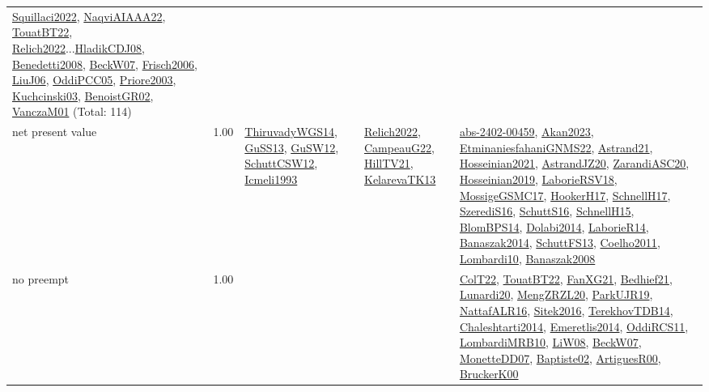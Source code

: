 {\begin{longtable}{p{3cm}r>{\raggedright\arraybackslash}p{6cm}>{\raggedright\arraybackslash}p{6cm}>{\raggedright\arraybackslash}p{8cm}}
\hyperref[detail:Squillaci2022]{Squillaci2022}, \hyperref[detail:NaqviAIAAA22]{NaqviAIAAA22}, \hyperref[detail:TouatBT22]{TouatBT22}, \hyperref[detail:Relich2022]{Relich2022}...\hyperref[detail:HladikCDJ08]{HladikCDJ08}, \hyperref[detail:Benedetti2008]{Benedetti2008}, \hyperref[detail:BeckW07]{BeckW07}, \hyperref[detail:Frisch2006]{Frisch2006}, \hyperref[detail:LiuJ06]{LiuJ06}, \hyperref[detail:OddiPCC05]{OddiPCC05}, \hyperref[detail:Priore2003]{Priore2003}, \hyperref[detail:Kuchcinski03]{Kuchcinski03}, \hyperref[detail:BenoistGR02]{BenoistGR02}, \hyperref[detail:VanczaM01]{VanczaM01} (Total: 114)\\
\index{net present value}\index{Concepts!net present value}net present value &  1.00 & \hyperref[detail:ThiruvadyWGS14]{ThiruvadyWGS14}, \hyperref[detail:GuSS13]{GuSS13}, \hyperref[detail:GuSW12]{GuSW12}, \hyperref[detail:SchuttCSW12]{SchuttCSW12}, \hyperref[detail:Icmeli1993]{Icmeli1993} & \hyperref[detail:Relich2022]{Relich2022}, \hyperref[detail:CampeauG22]{CampeauG22}, \hyperref[detail:HillTV21]{HillTV21}, \hyperref[detail:KelarevaTK13]{KelarevaTK13} & \hyperref[detail:abs-2402-00459]{abs-2402-00459}, \hyperref[detail:Akan2023]{Akan2023}, \hyperref[detail:EtminaniesfahaniGNMS22]{EtminaniesfahaniGNMS22}, \hyperref[detail:Astrand21]{Astrand21}, \hyperref[detail:Hosseinian2021]{Hosseinian2021}, \hyperref[detail:AstrandJZ20]{AstrandJZ20}, \hyperref[detail:ZarandiASC20]{ZarandiASC20}, \hyperref[detail:Hosseinian2019]{Hosseinian2019}, \hyperref[detail:LaborieRSV18]{LaborieRSV18}, \hyperref[detail:MossigeGSMC17]{MossigeGSMC17}, \hyperref[detail:HookerH17]{HookerH17}, \hyperref[detail:SchnellH17]{SchnellH17}, \hyperref[detail:SzerediS16]{SzerediS16}, \hyperref[detail:SchuttS16]{SchuttS16}, \hyperref[detail:SchnellH15]{SchnellH15}, \hyperref[detail:BlomBPS14]{BlomBPS14}, \hyperref[detail:Dolabi2014]{Dolabi2014}, \hyperref[detail:LaborieR14]{LaborieR14}, \hyperref[detail:Banaszak2014]{Banaszak2014}, \hyperref[detail:SchuttFS13]{SchuttFS13}, \hyperref[detail:Coelho2011]{Coelho2011}, \hyperref[detail:Lombardi10]{Lombardi10}, \hyperref[detail:Banaszak2008]{Banaszak2008}\\
\index{no preempt}\index{Concepts!no preempt}no preempt &  1.00 &  &  & \hyperref[detail:ColT22]{ColT22}, \hyperref[detail:TouatBT22]{TouatBT22}, \hyperref[detail:FanXG21]{FanXG21}, \hyperref[detail:Bedhief21]{Bedhief21}, \hyperref[detail:Lunardi20]{Lunardi20}, \hyperref[detail:MengZRZL20]{MengZRZL20}, \hyperref[detail:ParkUJR19]{ParkUJR19}, \hyperref[detail:NattafALR16]{NattafALR16}, \hyperref[detail:Sitek2016]{Sitek2016}, \hyperref[detail:TerekhovTDB14]{TerekhovTDB14}, \hyperref[detail:Chaleshtarti2014]{Chaleshtarti2014}, \hyperref[detail:Emeretlis2014]{Emeretlis2014}, \hyperref[detail:OddiRCS11]{OddiRCS11}, \hyperref[detail:LombardiMRB10]{LombardiMRB10}, \hyperref[detail:LiW08]{LiW08}, \hyperref[detail:BeckW07]{BeckW07}, \hyperref[detail:MonetteDD07]{MonetteDD07}, \hyperref[detail:Baptiste02]{Baptiste02}, \hyperref[detail:ArtiguesR00]{ArtiguesR00}, \hyperref[detail:BruckerK00]{BruckerK00}\\

\end{longtable}}
